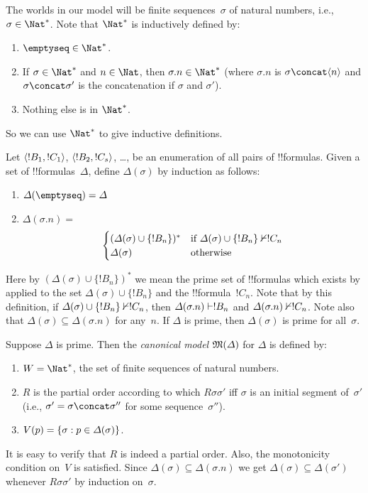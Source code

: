 \documentclass[../../../include/open-logic-section]{subfiles}
\begin{document}


The worlds in our model will be finite sequences~$\sigma$ of natural
numbers, i.e., $\sigma \in \Nat^*$. Note that $\Nat^*$ is inductively
defined by:
\begin{enumerate}
\item $\emptyseq \in \Nat^*$.
\item If $\sigma \in \Nat^*$ and $n \in \Nat$, then $\sigma.n \in
  \Nat^*$ (where $\sigma.n$ is $\sigma \concat \tuple{n}$ and $\sigma \concat \sigma'$ is the concatenation if $\sigma$ and $\sigma'$).
\item Nothing else is in $\Nat^*$.
\end{enumerate}
So we can use $\Nat^*$ to give inductive definitions.

Let $\langle !B_1, !C_1 \rangle$, $\langle !B_2, !C_s \rangle$, \dots, be an
enumeration of all pairs of !!{formula}s. Given a set of
!!{formula}s~$\Delta$, define $\Delta(\sigma)$ by induction as
follows:
\begin{enumerate}
\item $\Delta(\emptyseq) = \Delta$
\item $\Delta(\sigma.n) = {}$
  \[
  \begin{cases}
    (\Delta(\sigma) \cup \{!B_n\})^* &
    \text{if $\Delta(\sigma) \cup \{!B_n\} \Proves/ !C_n$} \\
    \Delta(\sigma) & \text{otherwise}
  \end{cases}
  \]
\end{enumerate}
Here by $(\Delta(\sigma) \cup \{!B_n\})^*$ we mean the prime set of
!!{formula}s which exists by  applied to the
set $\Delta(\sigma) \cup \{!B_n\}$ and the !!{formula}~$!C_n$. Note that by this definition, if
$\Delta(\sigma) \cup \{!B_n\} \Proves/ !C_n$, then $\Delta(\sigma.n)
\Proves !B_n$ and $\Delta(\sigma.n) \Proves/ !C_n$.  Note also that
$\Delta(\sigma) \subseteq \Delta(\sigma.n)$ for any~$n$. If $\Delta$
is prime, then $\Delta(\sigma)$ is prime for all~$\sigma$.

\begin{defn}
  Suppose $\Delta$ is prime.  Then the \emph{canonical model} $\mModel{M(\Delta)}$ for
  $\Delta$ is defined by:
  \begin{enumerate}
  \item $W = \Nat^*$, the set of finite sequences of natural numbers.
  \item $R$ is the partial order according to which $R\sigma\sigma'$
    iff $\sigma$ is an initial segment of~$\sigma'$ (i.e., $\sigma' =
    \sigma \concat \sigma''$ for some sequence~$\sigma''$).
  \item $V(p) = \{ \sigma : p \in \Delta(\sigma) \}$.
  \end{enumerate}
\end{defn}

It is easy to verify that $R$ is indeed a partial order. Also, the
monotonicity condition on~$V$ is satisfied.  Since $\Delta(\sigma)
\subseteq \Delta(\sigma.n)$ we get $\Delta(\sigma)
\subseteq \Delta(\sigma')$ whenever $R\sigma\sigma'$ by induction
on~$\sigma$.
\end{document}
